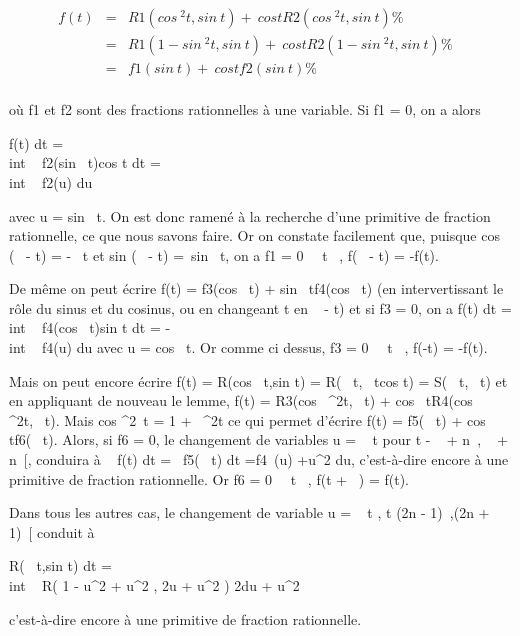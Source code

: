 \begin{align*} f(t)& =&
R1(cos~
^2t,sin~ t) +\
cos tR 2(cos~
^2t,sin~ t) \%&
\\ & =& R1(1
- sin~
^2t,sin~ t) +\
cos t R 2(1 - sin~
^2t,sin~ t)\%&
\\ & =&
f1(sin~ t) +\
cos t f2(sin~ t) \%&
\\ \end{align*}

où f1 et f2 sont des fractions rationnelles à une
variable. Si f1 = 0, on a alors

\int  f(t) dt =\\int ~
f2(sin~
t)cos t dt =\\int ~
f2(u) du

avec u = sin~ t. On est donc ramené à la
recherche d'une primitive de fraction rationnelle, ce que nous savons
faire. Or on constate facilement que, puisque
cos (\pi~ - t) = -\cos~ t
et sin (\pi~ - t) =\ sin~
t, on a f1 = 0 \Leftrightarrow
\forall~~t \in \mathbb{R}~, f(\pi~ - t) = -f(t).

De même on peut écrire f(t) = f3(cos~
t) + sin~
tf4(cos~ t) (en intervertissant le
rôle du sinus et du cosinus, ou en changeant t en  \pi~
\over 2 - t) et si f3 = 0, on a
\int  f(t) dt =\\int ~
f4(cos~
t)sin t dt = -\\int ~
f4(u) du avec u = cos~ t. Or comme ci
dessus, f3 = 0 \Leftrightarrow
\forall~~t \in {}~, f(-t) = -f(t).

Mais on peut encore écrire f(t) = R(cos~
t,sin t) = R(\cos~
t,\mathrmtg~
tcos t) = S(\cos~
t,\mathrmtg~ t) et en
appliquant de nouveau le lemme, f(t) =
R3(cos~
^2t,\mathrmtg~ t)
+ cos~
tR4(cos~
^2t,\mathrmtg~ t).
Mais cos ^2~t = 1
+\mathrmtg~
^2t ce qui permet d'écrire f(t) =
f5(\mathrmtg~ t)
+ cos~
tf6(\mathrmtg~ t).
Alors, si f6 = 0, le changement de variables u
= \mathrmtg~ t pour t \in{]}
- \pi~ \over 2 + n\pi~, \pi~  +
n\pi~{[}, conduira à \int ~ f(t) dt
=\int ~
f5(\mathrmtg~ t)
dt =\int   f4~(u) +u^2 du, c'est-à-dire encore à une primitive de fraction
rationnelle. Or f6 = 0 \Leftrightarrow
\forall~~t \in {}~, f(t + \pi~) = f(t).

Dans tous les autres cas, le changement de variable u
= \mathrmtg~  t
 , t \in{]}(2n - 1)\pi~,(2n + 1)\pi~{[} conduit à

\int  R(\cos~
t,sin t) dt =\\int ~ R(
1 - u^2  + u^2 , 2u
 + u^2 ) 2du \over 1
+ u^2

c'est-à-dire encore à une primitive de fraction rationnelle.

